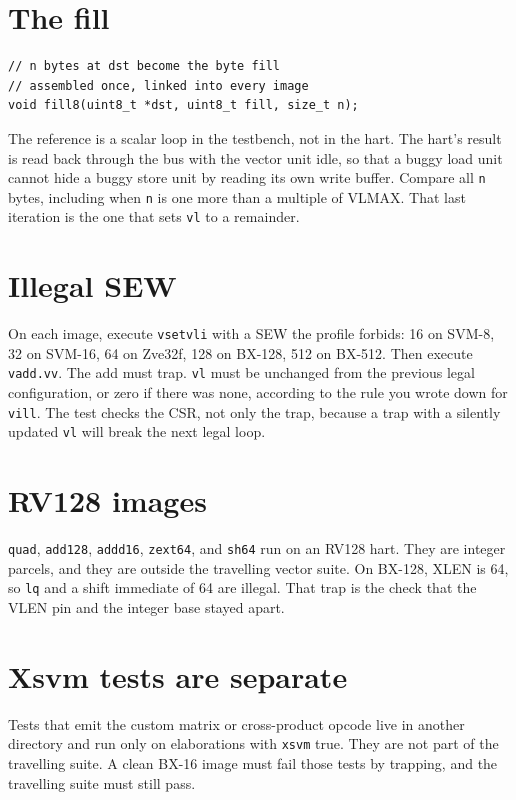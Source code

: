 \section{The fill}

\begin{lstlisting}
// n bytes at dst become the byte fill
// assembled once, linked into every image
void fill8(uint8_t *dst, uint8_t fill, size_t n);
\end{lstlisting}

The reference is a scalar loop in the testbench, not in the hart. The hart's result is read back through the bus with the vector unit idle, so that a buggy load unit cannot hide a buggy store unit by reading its own write buffer. Compare all \texttt{n} bytes, including when \texttt{n} is one more than a multiple of VLMAX. That last iteration is the one that sets \texttt{vl} to a remainder.

\section{Illegal SEW}

On each image, execute \texttt{vsetvli} with a SEW the profile forbids: 16 on SVM-8, 32 on SVM-16, 64 on Zve32f, 128 on BX-128, 512 on BX-512. Then execute \texttt{vadd.vv}. The add must trap. \texttt{vl} must be unchanged from the previous legal configuration, or zero if there was none, according to the rule you wrote down for \texttt{vill}. The test checks the CSR, not only the trap, because a trap with a silently updated \texttt{vl} will break the next legal loop.

\section{RV128 images}

\texttt{quad}, \texttt{add128}, \texttt{addd16}, \texttt{zext64}, and \texttt{sh64} run on an RV128 hart. They are integer parcels, and they are outside the travelling vector suite. On BX-128, XLEN is 64, so \texttt{lq} and a shift immediate of 64 are illegal. That trap is the check that the VLEN pin and the integer base stayed apart.

\section{Xsvm tests are separate}

Tests that emit the custom matrix or cross-product opcode live in another directory and run only on elaborations with \texttt{xsvm} true. They are not part of the travelling suite. A clean BX-16 image must fail those tests by trapping, and the travelling suite must still pass.

